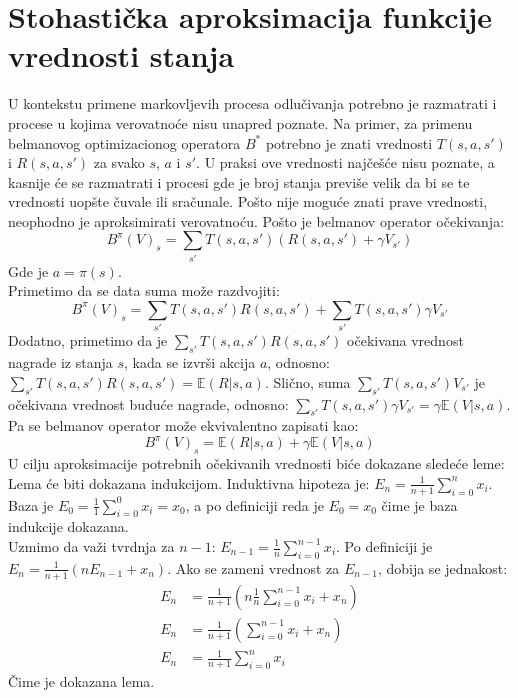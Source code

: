 \documentclass[a4paper,fleqn,12pt]{JMThesis}
\theoremstyle{plain}
\theoremstyle{definition}
\theoremstyle{definition}
\begin{document}
\section{Stohastička aproksimacija funkcije vrednosti stanja}
U kontekstu primene markovljevih procesa odlučivanja potrebno je razmatrati i procese u kojima verovatnoće nisu unapred poznate.
Na primer, za primenu belmanovog optimizacionog operatora $B^*$ potrebno je znati vrednosti $T(s,a,s')$ i $R(s,a,s')$ za svako $s$, $a$ i $s'$.
U praksi ove vrednosti najčešće nisu poznate, a kasnije će se razmatrati i procesi gde je broj stanja previše velik da bi se te vrednosti
uopšte čuvale ili sračunale. Pošto nije moguće znati prave vrednosti, neophodno je aproksimirati verovatnoću.
Pošto je belmanov operator očekivanja:
\[ 	B^{\pi}(V)_s = \sum_{s'}T(s,a,s')(R(s,a,s') + \gamma V_{s'}) \]
Gde je $a = \pi(s)$.\\
Primetimo da se data suma može razdvojiti:
\[ 	B^{\pi}(V)_s = \sum_{s'}T(s,a,s')R(s,a,s') + \sum_{s'}T(s,a,s')\gamma V_{s'}\]
Dodatno, primetimo da je $\sum_{s'}T(s,a,s')R(s,a,s')$ očekivana vrednost nagrade iz stanja $s$, kada se izvrši akcija $a$, odnosno:
$\sum_{s'}T(s,a,s')R(s,a,s') = \mathbb{E}(R | s,a)$.
Slično, suma $\sum_{s'}T(s,a,s') V_{s'}$ je očekivana vrednost buduće nagrade, odnosno:
$\sum_{s'}T(s,a,s')\gamma V_{s'} = \gamma \mathbb{E}(V | s, a)$. Pa se belmanov operator može ekvivalentno zapisati kao:
\[ 	B^{\pi}(V)_s = \mathbb{E}(R | s,a) + \gamma \mathbb{E}(V | s, a) \]
U cilju aproksimacije potrebnih očekivanih vrednosti biće dokazane sledeće leme:
\\
Lema će biti dokazana indukcijom. Induktivna hipoteza je: $E_n = \frac{1}{n+1}\sum_{i=0}^n x_i$.
Baza je $E_0 = \frac{1}{1}\sum_{i=0}^0 x_i = x_0$, a po definiciji reda je $E_0 = x_0$ čime je baza indukcije dokazana.\\
Uzmimo da važi tvrdnja za $n-1$: $E_{n-1} = \frac{1}{n}\sum_{i=0}^{n-1} x_i$.
Po definiciji je $E_n = \frac{1}{n+1}(n E_{n-1} + x_n)$. Ako se zameni vrednost za $E_{n-1}$, dobija se jednakost:
\[
	\begin{split}
		E_n &= \frac{1}{n+1}(n \frac{1}{n}\sum_{i=0}^{n-1}x_i + x_n)\\
		E_n &= \frac{1}{n+1}(\sum_{i=0}^{n-1}x_i + x_n)\\
		E_n &= \frac{1}{n+1}\sum_{i=0}^{n}x_i
	\end{split}
\]
Čime je dokazana lema.
\end{document}
